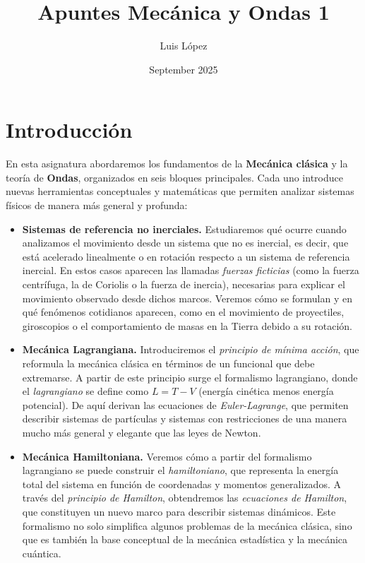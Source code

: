 \documentclass[a4paper,12pt]{article}
\title{Apuntes Mecánica y Ondas 1}
\author{Luis López}
\date{September 2025}
\begin{document}
\maketitle
\newpage
\tableofcontents
\newpage

\section*{Introducción}

En esta asignatura abordaremos los fundamentos de la \textbf{Mecánica clásica} y la teoría de \textbf{Ondas}, organizados en seis bloques principales. Cada uno introduce nuevas herramientas conceptuales y matemáticas que permiten analizar sistemas físicos de manera más general y profunda:

\begin{itemize}
    \item \textbf{Sistemas de referencia no inerciales.} 
    Estudiaremos qué ocurre cuando analizamos el movimiento desde un sistema que no es inercial, es decir, que está acelerado linealmente o en rotación respecto a un sistema de referencia inercial. En estos casos aparecen las llamadas \emph{fuerzas ficticias} (como la fuerza centrífuga, la de Coriolis o la fuerza de inercia), necesarias para explicar el movimiento observado desde dichos marcos. Veremos cómo se formulan y en qué fenómenos cotidianos aparecen, como en el movimiento de proyectiles, giroscopios o el comportamiento de masas en la Tierra debido a su rotación.

    \item \textbf{Mecánica Lagrangiana.} 
    Introduciremos el \emph{principio de mínima acción}, que reformula la mecánica clásica en términos de un funcional que debe extremarse. A partir de este principio surge el formalismo lagrangiano, donde el \emph{lagrangiano} se define como \(L = T - V\) (energía cinética menos energía potencial). De aquí derivan las ecuaciones de \emph{Euler-Lagrange}, que permiten describir sistemas de partículas y sistemas con restricciones de una manera mucho más general y elegante que las leyes de Newton.

    \item \textbf{Mecánica Hamiltoniana.} 
    Veremos cómo a partir del formalismo lagrangiano se puede construir el \emph{hamiltoniano}, que representa la energía total del sistema en función de coordenadas y momentos generalizados. A través del \emph{principio de Hamilton}, obtendremos las \emph{ecuaciones de Hamilton}, que constituyen un nuevo marco para describir sistemas dinámicos. Este formalismo no solo simplifica algunos problemas de la mecánica clásica, sino que es también la base conceptual de la mecánica estadística y la mecánica cuántica.


\end{itemize}
\end{document}
